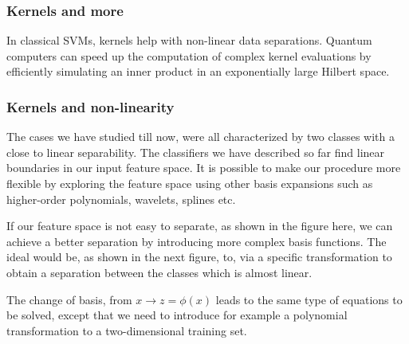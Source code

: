 \documentclass{beamer}
\begin{document}
\begin{frame}
\frametitle{Kernels and more}

In classical SVMs, kernels help with non-linear data
separations. Quantum computers can speed up the computation of complex
kernel evaluations by efficiently simulating an inner product in an
exponentially large Hilbert space.
\end{frame}

\begin{frame}
\frametitle{Kernels and non-linearity}

The cases we have studied till now, were all characterized by two classes
with a close to linear separability. The classifiers we have described
so far find linear boundaries in our input feature space. It is
possible to make our procedure more flexible by exploring the feature
space using other basis expansions such as higher-order polynomials,
wavelets, splines etc.

If our feature space is not easy to separate, as shown in the figure
here, we can achieve a better separation by introducing more complex
basis functions. The ideal would be, as shown in the next figure, to, via a specific transformation to 
obtain a separation between the classes which is almost linear. 

The change of basis, from $x\rightarrow z=\phi(x)$ leads to the same type of equations to be solved, except that
we need to introduce for example a polynomial transformation to a two-dimensional training set.


















































\end{frame}
\end{document}
